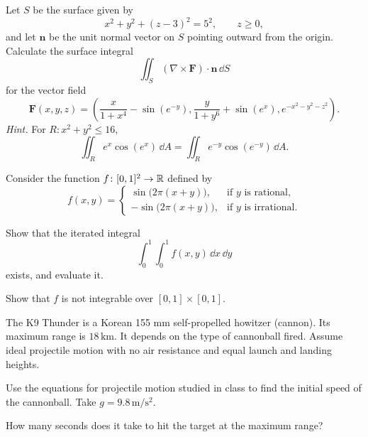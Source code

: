 \begin{problem}
Let $S$ be the surface given by
\[
x^2+y^2+(z-3)^2=5^2,
\qquad
z\ge0,
\]
and let $\mathbf n$ be the unit normal vector on $S$ pointing outward from the origin. Calculate the surface integral
\[
\iint_S (\nabla\times\mathbf F)\cdot\mathbf n\,\dd S
\]
for the vector field
\[
\mathbf F(x, y, z)=
\left(
\frac{x}{1+x^4}-\sin(e^{-y}),
\frac{y}{1+y^6}+\sin(e^x),
e^{-x^2-y^2-z^2}
\right).
\]
\textit{Hint.} For $R\colon x^2+y^2\le16$,
\[
\iint_R e^x\cos(e^x)\,\dd A
=
\iint_R e^{-y}\cos(e^{-y})\,\dd A.
\]
\end{problem}

\begin{problem}
Consider the function $f\colon[0, 1]^2\to\mathbb{R}$ defined by
\[
f(x, y)=
\begin{cases}
\sin\bigl(2\pi(x+y)\bigr), & \text{if $y$ is rational}, \\
-\sin\bigl(2\pi(x+y)\bigr), & \text{if $y$ is irrational}.
\end{cases}
\]
\begin{problemsubparts}
\item Show that the iterated integral
\[
\int_0^1\int_0^1 f(x, y)\,\dd x\,\dd y
\]
exists, and evaluate it.
\item Show that $f$ is not integrable over $[0, 1]\times[0, 1]$.
\end{problemsubparts}
\end{problem}

\begin{problem}
The K9 Thunder is a Korean 155 mm self-propelled howitzer (cannon). Its maximum range is $18\,\mathrm{km}$. It depends on the type of cannonball fired. Assume ideal projectile motion with no air resistance and equal launch and landing heights.
\begin{problemsubparts}
\item Use the equations for projectile motion studied in class to find the initial speed of the cannonball. Take $g=9.8\,\mathrm{m/s^2}$.
\item How many seconds does it take to hit the target at the maximum range?
\end{problemsubparts}
\end{problem}

